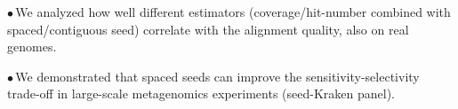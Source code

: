 \documentclass[portrait,final,a0paper,fontscale=0.277]{baposter}
\begin{document}
\begin{poster}
{$\bullet$\,We analyzed how well different estimators (coverage/hit-number
  combined with spaced/contiguous seed) correlate with the alignment
  quality, also on real genomes. %
    
$\bullet$\,We demonstrated that spaced seeds can improve the sensitivity-selectivity trade-off in large-scale metagenomics experiments ({\sc seed-Kraken} panel).
%
   
% 
% 
\vspace{0.3em}
  }



\end{poster}
\end{document}
